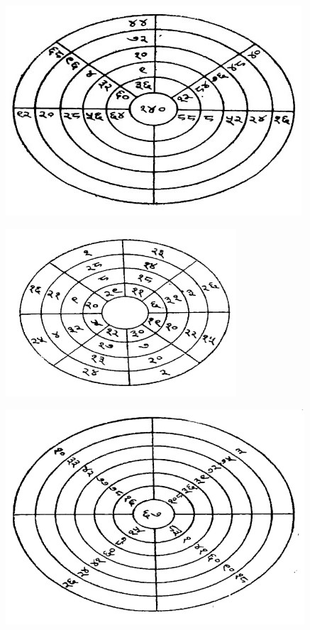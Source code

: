 \documentclass[11pt, openany]{book}
\begin{document}
\begin{figure}[h!]
    \centering
    \includegraphics[scale=0.6]{graphics/426_2.jpg}
    
\end{figure}

\newpage

\begin{figure}[h!]
    \centering
    \includegraphics[scale=0.6]{graphics/427_1.jpg}
    
\end{figure}

\begin{figure}[h!]
    \centering
    \includegraphics[scale=0.6]{graphics/427_2.jpg}
    
\end{figure}
\end{document}
